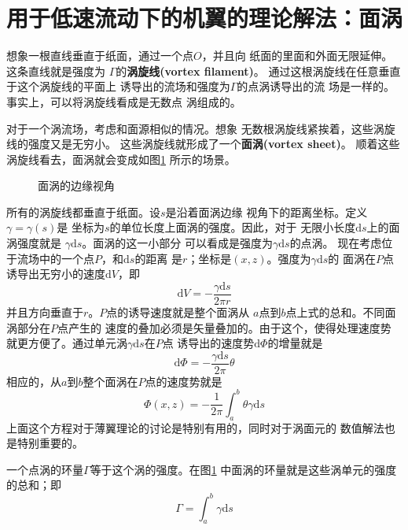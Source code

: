 \section{用于低速流动下的机翼的理论解法：面涡}
想象一根直线垂直于纸面，通过一个点$O$，并且向
纸面的里面和外面无限延伸。这条直线就是强度为
$\Gamma$的{\bfseries 涡旋线(vortex filament)}。
通过这根涡旋线在任意垂直于这个涡旋线的平面上
诱导出的流场和强度为$\Gamma$的点涡诱导出的流
场是一样的。事实上，可以将涡旋线看成是无数点
涡组成的。

对于一个涡流场，考虑和面源相似的情况。想象
无数根涡旋线紧挨着，这些涡旋线的强度又是无穷小。
这些涡旋线就形成了一个{\bfseries 面涡(vortex sheet)}。
顺着这些涡旋线看去，面涡就会变成如图\ref{fig:vortex sheet}
所示的场景。
\begin{figure}[!ht]
  \centering
  
  \caption{面涡的边缘视角}
  \label{fig:vortex sheet}
\end{figure}
所有的涡旋线都垂直于纸面。设$s$是沿着面涡边缘
视角下的距离坐标。定义$\gamma=\gamma(s)$是
坐标为$s$的单位长度上面涡的强度。因此，对于
无限小长度$\mathrm{d}s$上的面涡强度就是
$\gamma\mathrm{d}s$。面涡的这一小部分
可以看成是强度为$\gamma\mathrm{d}s $的点涡。
现在考虑位于流场中的一个点$P$，和$\mathrm{d}s$的距离
是$r$；坐标是$(x,z)$。强度为$\gamma\mathrm{d}s$的
面涡在$P$点诱导出无穷小的速度$\mathrm{d}V$，即
\[
  \mathrm{d}V=-\frac{\gamma \mathrm{d}s }{2\pi r }
\]
并且方向垂直于$r$。$P$点的诱导速度就是整个面涡从
$a$点到$b$点上式的总和。不同面涡部分在$P$点产生的
速度的叠加必须是矢量叠加的。由于这个，使得处理速度势
就更方便了。通过单元涡$\gamma \mathrm{d}s $在$P$点
诱导出的速度势$\mathrm{d} \Phi$的增量就是
\[
  \mathrm{d}\Phi=-\frac{\gamma \mathrm{d}s }{2\pi}\theta
\]
相应的，从$a$到$b $整个面涡在$P$点的速度势就是
\[
  \Phi(x,z)=- \frac{1}{2\pi}\int _a^b \theta \gamma \mathrm{d}s 
\]
上面这个方程对于薄翼理论的讨论是特别有用的，同时对于涡面元的
数值解法也是特别重要的。

一个点涡的环量$\Gamma$等于这个涡的强度。在图\ref{fig:vortex sheet}
中面涡的环量就是这些涡单元的强度的总和；即
\[
  \Gamma=\int _a^b \gamma \mathrm{d}s 
\]

